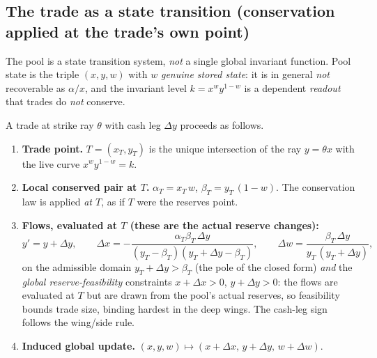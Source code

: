 \documentclass[runningheads]{llncs}
\begin{document}
\subsection{The trade as a state transition (conservation applied at the trade's own point)}
\label{sec:transition}
The pool is a state transition system, \emph{not} a single global invariant
function. Pool state is the triple $(x,y,w)$ with $w$ \emph{genuine stored
state}: it is in general \emph{not} recoverable as $\alpha/x$, and the invariant
level $k=x^{w}y^{1-w}$ is a dependent \emph{readout} that trades do \emph{not}
conserve.

A trade at strike ray $\theta$ with cash leg $\Delta y$ proceeds as follows.
\begin{enumerate}[leftmargin=2em]
  \item \textbf{Trade point.} $T=(x_T,y_T)$ is the unique intersection of the ray
        $y=\theta x$ with the live curve $x^{w}y^{1-w}=k$.
  \item \textbf{Local conserved pair at $T$.} $\alpha_T=x_T\,w$,
        $\beta_T=y_T\,(1-w)$. The conservation law is applied \emph{at $T$}, as if
        $T$ were the reserves point.
  \item \textbf{Flows, evaluated at $T$ (these are the actual reserve changes):}
        \begin{equation}
          y'=y+\Delta y,\qquad
          \Delta x=-\frac{\alpha_T\beta_T\,\Delta y}
                          {(y_T-\beta_T)(y_T+\Delta y-\beta_T)},\qquad
          \Delta w=\frac{\beta_T\,\Delta y}{y_T\,(y_T+\Delta y)},
          \label{eq:trade}
        \end{equation}
        on the admissible domain $y_T+\Delta y>\beta_T$ (the pole of the closed
        form) \emph{and} the \emph{global reserve-feasibility} constraints
        $x+\Delta x>0$, $y+\Delta y>0$: the flows are evaluated at $T$ but are
        drawn from the pool's actual reserves, so feasibility bounds trade size,
        binding hardest in the deep wings. The cash-leg sign follows the wing/side
        rule.
  \item \textbf{Induced global update.} $(x,y,w)\mapsto(x+\Delta x,\,y+\Delta y,\,
        w+\Delta w)$.
\end{enumerate}
\end{document}
